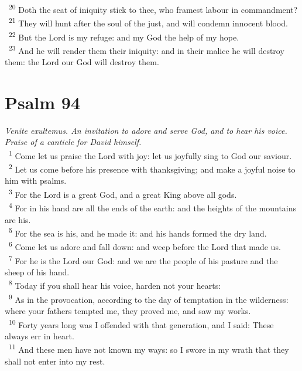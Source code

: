 \documentclass[a5paper,12pt]{article}
\begin{document}
\begin{multicols*}{2}
~\textsuperscript{20} Doth the seat of iniquity stick to thee, who framest labour in commandment?\\
~\textsuperscript{21} They will hunt after the soul of the just, and will condemn innocent blood.\\
~\textsuperscript{22} But the Lord is my refuge: and my God the help of my hope.\\
~\textsuperscript{23} And he will render them their iniquity: and in their malice he will destroy them: the Lord our God will destroy them.\\

\section{Psalm 94}
\label{sec:orgd909f20}
\emph{Venite exultemus. An invitation to adore and serve God, and to hear his voice. Praise of a canticle for David himself.}\\

~\textsuperscript{1} Come let us praise the Lord with joy: let us joyfully sing to God our saviour.\\
~\textsuperscript{2} Let us come before his presence with thanksgiving; and make a joyful noise to him with psalms.\\
~\textsuperscript{3} For the Lord is a great God, and a great King above all gods.\\
~\textsuperscript{4} For in his hand are all the ends of the earth: and the heights of the mountains are his.\\
~\textsuperscript{5} For the sea is his, and he made it: and his hands formed the dry land.\\
~\textsuperscript{6} Come let us adore and fall down: and weep before the Lord that made us.\\
~\textsuperscript{7} For he is the Lord our God: and we are the people of his pasture and the sheep of his hand.\\
~\textsuperscript{8} Today if you shall hear his voice, harden not your hearts:\\
~\textsuperscript{9} As in the provocation, according to the day of temptation in the wilderness: where your fathers tempted me, they proved me, and saw my works.\\
~\textsuperscript{10} Forty years long was I offended with that generation, and I said: These always err in heart.\\
~\textsuperscript{11} And these men have not known my ways: so I swore in my wrath that they shall not enter into my rest.\\


\end{multicols*}
\end{document}
